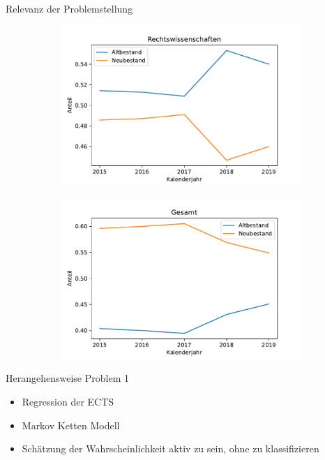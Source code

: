 \documentclass[17pt, fleqn]{beamer}
\begin{document}
\begin{frame}{Relevanz der Problemstellung}
\begin{figure}[ht]
\begin{subfigure}{0.49\textwidth}
            \includegraphics[width = 1\textwidth]{jus2.pdf}
        \end{subfigure}
        \begin{subfigure}{0.49\textwidth}
            
            \includegraphics[width = 1\textwidth]{ges2.pdf}
        \end{subfigure}
            
    \end{figure}
    
\end{frame}

\begin{frame}{Herangehensweise Problem 1}
    \begin{itemize}
        \item Regression der ECTS \\[1cm]
        \pause
        \item Markov Ketten Modell \\[1cm]
        \pause
        \item Schätzung der Wahrscheinlichkeit aktiv zu sein, ohne zu klassifizieren
    \end{itemize}
    
\end{frame}
\end{document}
